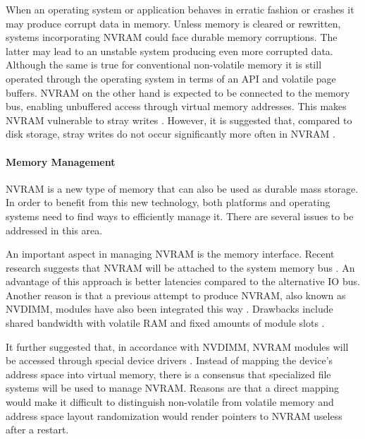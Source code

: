 When an operating system or application behaves in erratic fashion or crashes it
may produce corrupt data in memory. Unless memory is cleared or rewritten,
systems incorporating NVRAM could face durable memory corruptions. The latter
may lead to an unstable system producing even more corrupted data. Although the
same is true for conventional non-volatile memory it is still operated through
the operating system in terms of an API and volatile page buffers. NVRAM on the
other hand is expected to be connected to the memory bus, enabling unbuffered
access through virtual memory addresses. This makes NVRAM vulnerable to stray
writes \cite{condit2009better, oukid2017data}. However, it is suggested that,
compared to disk storage, stray writes do not occur significantly more
often in NVRAM \cite{chen1996rio}.

\paragraph{Memory Management}

NVRAM is a new type of memory that can also be used as durable mass storage. In
order to benefit from this new technology, both platforms and operating systems
need to find ways to efficiently manage it. There are several issues to be
addressed in this area.


An important aspect in managing NVRAM is the memory interface. Recent research
suggests that NVRAM will be attached to the system memory bus
\cite{intel2017nvdimm, oukid2017data}. An advantage of this approach is better
latencies compared to the alternative IO bus. Another reason is that a previous
attempt to produce NVRAM, also known as NVDIMM, modules have also been
integrated this way \cite{dulloor2014system}. Drawbacks include shared bandwidth
with volatile RAM and fixed amounts of module slots \cite{condit2009better}.

It further suggested that, in accordance with NVDIMM, NVRAM modules will be
accessed through special device drivers \cite{oukid2017data}. Instead of mapping
the device's address space into virtual memory, there is a consensus that
specialized file systems will be used to manage NVRAM. Reasons are that a direct
mapping would make it difficult to distinguish non-volatile from volatile memory
and address space layout randomization would render pointers to NVRAM useless
after a restart.

